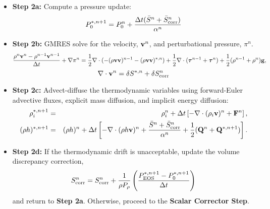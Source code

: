 \documentclass[final]{siamltex}
\def\Fb {{\bf F}}
\def\gb {{\bf g}}
\def\Qb {{\bf Q}}
\def\vb {{\bf v}}
\def\taub   {\boldsymbol{\tau}}
\def\half   {\frac{1}{2}}
\begin{document}
\begin{itemize}
\item {\bf Step 2a:} Compute a pressure update:
\begin{equation}
P_0^{*,n+1} = P_0^n + \frac{\Delta t(\bar{S}^n + \bar{S}_{\rm corr}^n)}{\alpha^n}
\end{equation}
\item {\bf Step 2b:} GMRES solve for the velocity, $\vb^n$, and perturbational
pressure, $\pi^n$.
\begin{equation}
\frac{\rho^n\vb^n - \rho^{n-1}\vb^{n-1}}{\Delta t} + \nabla\pi^n = \half\nabla\cdot(-(\rho\vb\vb)^{n-1} - (\rho\vb\vb)^{*,n}) + \frac{1}{2}\nabla\cdot(\taub^{n-1} + \taub^n) + \frac{1}{2}(\rho^{n-1} + \rho^n)\gb,
\end{equation}
\begin{equation}
\nabla\cdot\vb^n = \delta S^{*,n} + \delta S_{\rm corr}^n
\end{equation}
\item {\bf Step 2c:} Advect-diffuse the thermodynamic variables using forward-Euler advective fluxes,
explicit mass diffusion, and implicit energy diffusion:
\begin{eqnarray}
\rho_i^{*,n+1} &=& \rho_i^n + \Delta t\left[-\nabla\cdot(\rho_i\vb)^n + \Fb^n\right], \\
(\rho h)^{*,n+1} &=& (\rho h)^n + \Delta t\left[-\nabla\cdot(\rho h\vb)^n + \frac{\bar{S}^n + \bar{S}_{\rm corr}^n}{\alpha^n} + \frac{1}{2}(\Qb^n + \Qb^{*,n+1})\right].\nonumber\\
\end{eqnarray}
\item {\bf Step 2d:} If the thermodynamic drift is unacceptable, update the volume 
discrepancy correction,
\begin{equation}
S_{\rm corr}^n = S_{\rm corr}^n + \frac{1}{\rho P_\rho}\left(\frac{P_{\rm EOS}^{*,n+1} - P_0^{*,n+1}}{\Delta t}\right)
\end{equation}
and return to {\bf Step 2a}.  Otherwise, proceed to the {\bf Scalar Corrector Step}.\\
\end{itemize}
\end{document}
